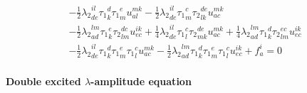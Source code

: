 \begin{gather*}
- \frac{1}{2}{\lambda_2}^{il}_{de} {\tau_1}^{d}_{k} {\tau_1}^{e}_{m} u^{mk}_{al}
- \frac{1}{2}{\lambda_2}^{il}_{de} {\tau_1}^{c}_{m} {\tau_2}^{de}_{lk} u^{mk}_{ac} \\
- \frac{1}{2}{\lambda_2}^{lm}_{ad} {\tau_1}^{e}_{k} {\tau_2}^{dc}_{lm} u^{ik}_{ec}
+ \frac{1}{4}{\lambda_2}^{il}_{de} {\tau_1}^{c}_{l} {\tau_2}^{de}_{mk} u^{mk}_{ac}
+ \frac{1}{4}{\lambda_2}^{lm}_{ad} {\tau_1}^{d}_{k} {\tau_2}^{ec}_{lm} u^{ik}_{ec} \\
- \frac{1}{2}{\lambda_2}^{il}_{de} {\tau_1}^{d}_{k} {\tau_1}^{e}_{m} {\tau_1}^{c}_{l} u^{mk}_{ac}
- \frac{1}{2}{\lambda_2}^{lm}_{ad} {\tau_1}^{d}_{k} {\tau_1}^{e}_{m} {\tau_1}^{c}_{l} u^{ik}_{ec}
+ f^{i}_{a} = 0
\end{gather*}

\paragraph{Double excited $\lambda$-amplitude equation}


